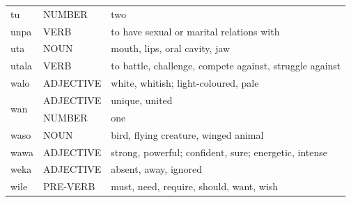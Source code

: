 \documentclass[14pt, a4paper]{extreport}
\begin{document}
\begin{longtable}{llp{10cm}}
  tu & NUMBER & two \\
  unpa & VERB & to have sexual or marital relations with \\
  uta & NOUN & mouth, lips, oral cavity, jaw \\
  utala & VERB & to battle, challenge, compete against, struggle against \\
  walo & ADJECTIVE & white, whitish; light-coloured, pale \\
  \multirow[t]{2}{*}{wan} & ADJECTIVE & unique, united \\
  & NUMBER & one \\
  waso & NOUN & bird, flying creature, winged animal \\
  wawa & ADJECTIVE & strong, powerful; confident, sure; energetic, intense \\
  weka & ADJECTIVE & absent, away, ignored \\
  wile & PRE-VERB & must, need, require, should, want, wish \\
\end{longtable}
\end{document}
